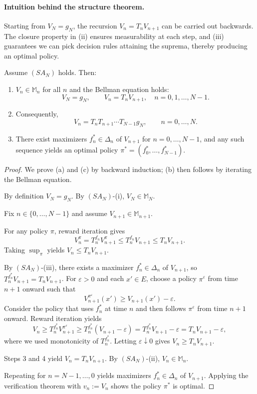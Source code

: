 \paragraph{Intuition behind the structure theorem.}
Starting from $V_N=g_N$, the recursion $V_n=T_nV_{n+1}$ can be carried out backwards. The closure property in (ii) ensures measurability at each step, and (iii) guarantees we can pick decision rules attaining the suprema, thereby producing an optimal policy.

\begin{theorem}
Assume $(SA_N)$ holds. Then:
\begin{enumerate}[label=(\alph*)]
  \item $V_n\in\mathcal{\mathbb{M}}_n$ for all $n$ and the Bellman equation holds:
  \[
  V_N=g_N,\qquad V_n=T_nV_{n+1},\quad n=0,1,\dots,N-1.
  \]
  \item Consequently,
  \[
  V_n = T_n T_{n+1}\cdots T_{N-1} g_N,\qquad n=0,\dots,N.
  \]
  \item There exist maximizers $f_n^*\in\Delta_n$ of $V_{n+1}$ for $n=0,\dots,N-1$, and any such sequence yields an optimal policy $\pi^*=(f_0^*,\dots,f_{N-1}^*)$.
\end{enumerate}
\end{theorem}

\begin{proof}
We prove (a) and (c) by backward induction; (b) then follows by iterating the Bellman equation.

By definition $V_N=g_N$.
By $(SA_N)$-(i), $V_N\in\mathcal{\mathbb{M}}_N$.

Fix $n\in\{0,\dots,N-1\}$ and assume $V_{n+1}\in\mathcal{\mathbb{M}}_{n+1}$.

For any policy $\pi$, reward iteration gives
\[
V_n^{\pi} = T_n^{f_n} V_{n+1}^{\pi}
\le T_n^{f_n}V_{n+1}
\le T_n V_{n+1}.
\]
Taking $\sup_{\pi}$ yields $V_n\le T_n V_{n+1}$.

By $(SA_N)$-(iii), there exists a maximizer $f_n^*\in\Delta_n$ of $V_{n+1}$, so $T_n^{f_n^*}V_{n+1}=T_nV_{n+1}$.
For $\varepsilon>0$ and each $x'\in E$, choose a policy $\pi^{\varepsilon}$ from time $n+1$ onward such that
\[
V_{n+1}^{\pi^{\varepsilon}}(x')\ge V_{n+1}(x')-\varepsilon.
\]
Consider the policy that uses $f_n^*$ at time $n$ and then follows $\pi^{\varepsilon}$ from time $n+1$ onward.
Reward iteration yields
\[
V_n\ge T_n^{f_n^*}V_{n+1}^{\pi^{\varepsilon}}
\ge T_n^{f_n^*}(V_{n+1}-\varepsilon)
= T_n^{f_n^*}V_{n+1}-\varepsilon
= T_nV_{n+1}-\varepsilon,
\]
where we used monotonicity of $T_n^{f_n^*}$.
Letting $\varepsilon\downarrow 0$ gives $V_n\ge T_nV_{n+1}$.

Steps 3 and 4 yield $V_n=T_nV_{n+1}$.
By $(SA_N)$-(ii), $V_n\in\mathcal{\mathbb{M}}_n$.

Repeating for $n=N-1,\dots,0$ yields maximizers $f_n^*\in\Delta_n$ of $V_{n+1}$.
Applying the verification theorem with $v_n:=V_n$ shows the policy $\pi^*$ is optimal.
\end{proof}

